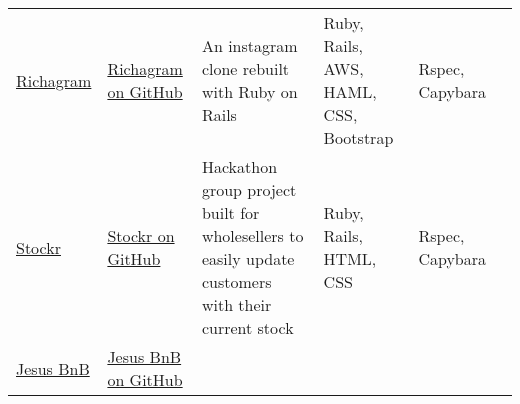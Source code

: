 \documentclass[]{article}
\begin{document}
\begin{longtable}[]{@{}llllll@{}}
\begin{minipage}[t]{0.05\columnwidth}\raggedright\strut
\href{https://richagram.herokuapp.com/}{Richagram}\strut
\end{minipage} & \begin{minipage}[t]{0.05\columnwidth}\raggedright\strut
\href{https://github.com/richo225/richagram}{Richagram on GitHub}\strut
\end{minipage} & \begin{minipage}[t]{0.05\columnwidth}\raggedright\strut
An instagram clone rebuilt with Ruby on Rails\strut
\end{minipage} & \begin{minipage}[t]{0.05\columnwidth}\raggedright\strut
Ruby, Rails, AWS, HAML, CSS, Bootstrap\strut
\end{minipage} & \begin{minipage}[t]{0.05\columnwidth}\raggedright\strut
Rspec, Capybara\strut
\end{minipage}\tabularnewline
\begin{minipage}[t]{0.05\columnwidth}\raggedright\strut
\href{https://github.com/SamedYalniz/stockr}{Stockr}\strut
\end{minipage} & \begin{minipage}[t]{0.05\columnwidth}\raggedright\strut
\href{https://github.com/SamedYalniz/stockr}{Stockr on GitHub}\strut
\end{minipage} & \begin{minipage}[t]{0.05\columnwidth}\raggedright\strut
Hackathon group project built for wholesellers to easily update
customers with their current stock\strut
\end{minipage} & \begin{minipage}[t]{0.05\columnwidth}\raggedright\strut
Ruby, Rails, HTML, CSS\strut
\end{minipage} & \begin{minipage}[t]{0.05\columnwidth}\raggedright\strut
Rspec, Capybara\strut
\end{minipage}\tabularnewline
\begin{minipage}[t]{0.05\columnwidth}\raggedright\strut
\href{http://bnb-jesus.herokuapp.com/}{Jesus BnB}\strut
\end{minipage} & \begin{minipage}[t]{0.05\columnwidth}\raggedright\strut
\href{https://github.com/richo225/jesus_bnb}{Jesus BnB on GitHub}\strut
\end{minipage} & \begin{minipage}[t]{0.05\columnwidth}\raggedright\strut

\end{minipage}
\end{longtable}
\end{document}
